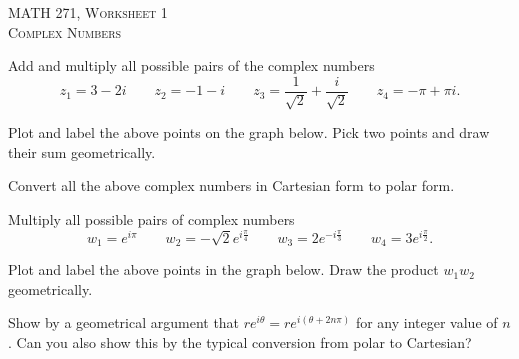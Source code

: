\documentclass[12pt]{article} %
\begin{document}
\begin{center}
   \textsc{\large MATH 271, Worksheet 1}\\
   \textsc{Complex Numbers}
\end{center}
\vspace{.5cm}

\begin{problem}
Add and multiply all possible pairs of the complex numbers
\[
z_1 = 3-2i \qquad z_2 = -1-i \qquad z_3 = \frac{1}{\sqrt{2}}+\frac{i}{\sqrt{2}} \qquad z_4 = -\pi + \pi i.
\]
\end{problem}

\begin{problem}
Plot and label the above points on the graph below. Pick two points and draw their sum geometrically. 
        \begin{center}
        \end{center}
\end{problem}

\begin{problem}
Convert all the above complex numbers in Cartesian form to polar form.
\end{problem}

\begin{problem}
Multiply all possible pairs of complex numbers
\[
w_1 = e^{i\pi} \qquad w_2 = -\sqrt{2} e^{i\frac{\pi}{4}} \qquad w_3 = 2 e^{-i\frac{\pi}{3}} \qquad w_4= 3 e^{i\frac{\pi}{2}}.
\]
\end{problem}

\begin{problem}
Plot and label the above points in the graph below.  Draw the product $w_1w_2$ geometrically.
        \begin{center}
        \end{center}
\end{problem}
\newpage

\begin{problem}
Show by a geometrical argument that $re^{i\theta}=re^{i(\theta+2n\pi)}$ for any integer value of $n$.  Can you also show this by the typical conversion from polar to Cartesian?
\end{problem}
\end{document}
